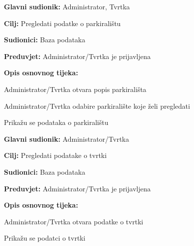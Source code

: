 \noindent {}
\begin{packed_item}
	
	\item \textbf{Glavni sudionik: } Administrator, Tvrtka
	\item \textbf{Cilj:} Pregledati podatke o parkiralištu
	\item \textbf{Sudionici:} Baza podataka
	\item \textbf{Preduvjet:} Administrator/Tvrtka je prijavljena
	\item \textbf{Opis osnovnog tijeka:}
	
	\item[] \begin{packed_enum}
		
		\item Administrator/Tvrtka otvara popis parkirališta
		\item Administrator/Tvrtka odabire parkiralište koje želi pregledati
		\item Prikažu se podataka o parkiralištu
	
	\end{packed_enum}
\end{packed_item}


\noindent {}
\begin{packed_item}
	
	\item \textbf{Glavni sudionik: } Administrator/Tvrtka
	\item  \textbf{Cilj:} Pregledati podatake o tvrtki
	\item  \textbf{Sudionici:} Baza podataka
	\item  \textbf{Preduvjet:} Administrator/Tvrtka je prijavljena
	\item  \textbf{Opis osnovnog tijeka:}
	
	\item[] \begin{packed_enum}
		
		\item Administrator/Tvrtka otvara podatke o tvrtki
		\item Prikažu se podatci o tvrtki
	
	\end{packed_enum}
	
\end{packed_item}



